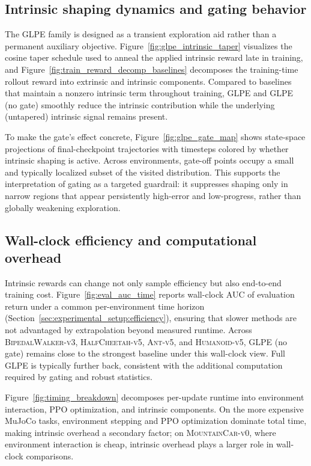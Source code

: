 

\subsection{Intrinsic shaping dynamics and gating behavior}

The GLPE family is designed as a transient exploration aid rather than a permanent auxiliary objective.
Figure~\ref{fig:glpe_intrinsic_taper} visualizes the cosine taper schedule used to anneal the applied intrinsic reward late in training, and Figure~\ref{fig:train_reward_decomp_baselines} decomposes the training-time rollout reward into extrinsic and intrinsic components.
Compared to baselines that maintain a nonzero intrinsic term throughout training, GLPE and GLPE (no gate) smoothly reduce the intrinsic contribution while the underlying (untapered) intrinsic signal remains present.

To make the gate's effect concrete, Figure~\ref{fig:glpe_gate_map} shows state-space projections of final-checkpoint trajectories with timesteps colored by whether intrinsic shaping is active.
Across environments, gate-off points occupy a small and typically localized subset of the visited distribution.
This supports the interpretation of gating as a targeted guardrail: it suppresses shaping only in narrow regions that appear persistently high-error and low-progress, rather than globally weakening exploration.

\subsection{Wall-clock efficiency and computational overhead}

Intrinsic rewards can change not only sample efficiency but also end-to-end training cost.
Figure~\ref{fig:eval_auc_time} reports wall-clock AUC of evaluation return under a common per-environment time horizon (Section~\ref{sec:experimental_setup:efficiency}), ensuring that slower methods are not advantaged by extrapolation beyond measured runtime.
Across \textsc{BipedalWalker-v3}, \textsc{HalfCheetah-v5}, \textsc{Ant-v5}, and \textsc{Humanoid-v5}, GLPE (no gate) remains close to the strongest baseline under this wall-clock view.
Full GLPE is typically further back, consistent with the additional computation required by gating and robust statistics.

Figure~\ref{fig:timing_breakdown} decomposes per-update runtime into environment interaction, PPO optimization, and intrinsic components.
On the more expensive MuJoCo tasks, environment stepping and PPO optimization dominate total time, making intrinsic overhead a secondary factor; on \textsc{MountainCar-v0}, where environment interaction is cheap, intrinsic overhead plays a larger role in wall-clock comparisons.

